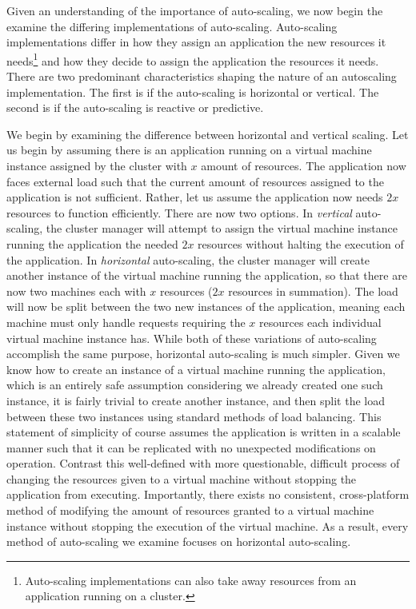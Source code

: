\documentclass[twoside]{report}
\begin{document}
Given an understanding of the importance of auto-scaling, we now begin the
examine the differing implementations of auto-scaling. Auto-scaling
implementations differ in how they assign an application the new resources it
needs\footnote{Auto-scaling implementations can also take away resources from
an application running on a cluster.} and how they decide to
assign the application the resources it needs.
There are two predominant characteristics shaping the nature of an autoscaling
implementation. The first is if the auto-scaling is horizontal or vertical. The
second is if the auto-scaling is reactive or predictive.

We begin by examining the difference between horizontal and vertical scaling.
Let us begin by assuming there is an application running on a virtual machine
instance assigned by the cluster with $x$ amount of resources. The application
now faces external load such that the current amount of resources assigned to
the application is not sufficient. Rather, let us assume the application now
needs $2x$ resources to function efficiently. There are now two options. In
\textit{vertical} auto-scaling, the cluster manager will attempt to assign the
virtual machine instance running the application the needed $2x$ resources
without halting the execution of the application. In \textit{horizontal}
auto-scaling, the cluster manager will create another instance of the virtual
machine running the application, so that there are now two machines each with
$x$ resources ($2x$ resources in summation). The load will now be split between
the two new instances of the application, meaning each machine must only handle
requests requiring the $x$ resources each individual virtual machine instance
has.\cite[pg.
4]{auto-scaling-techniques-for-elastic-applications-in-cloud-environments} While
both of these variations of auto-scaling accomplish the same purpose, horizontal
auto-scaling is much simpler. Given we know how to create an instance of a
virtual machine running the application, which is an entirely safe assumption
considering we already created one such instance, it is fairly trivial to create
another instance, and then split the load between these two instances using
standard methods of load balancing. This
statement of simplicity of course assumes the application is written in a
scalable manner such that it can be replicated with no unexpected modifications
on operation. Contrast this well-defined with more questionable, difficult
process of changing the resources given to a virtual machine without stopping
the application from executing. Importantly, there exists
no consistent, cross-platform method of
modifying the amount of resources granted to a virtual machine instance without
stopping the execution of the virtual machine. As a result, every method of
auto-scaling we examine focuses on horizontal auto-scaling.\cite[pg.
4]{auto-scaling-techniques-for-elastic-applications-in-cloud-environments}
\end{document}
